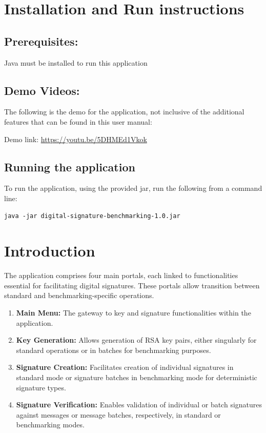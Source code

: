 \documentclass[]{final_report}
\begin{document}
\tableofcontents{}\newpage



\chapter{Installation and Run instructions}

\section*{Prerequisites:} Java must be installed to run this application

\section*{Demo Videos:}
The following is the demo for the application, not inclusive of the additional features that can be found in this user manual:

Demo link: \url{https://youtu.be/5DHMEd1Vkok}


\section*{Running the application}

To run the application, using the provided jar, run the following from a command line:

\begin{verbatim}
java -jar digital-signature-benchmarking-1.0.jar
\end{verbatim}



\chapter{Introduction}

The application comprises four main portals, each linked to functionalities essential for facilitating digital signatures. These portals allow transition between standard and benchmarking-specific operations.
\begin{enumerate}
    \item \textbf{Main Menu:} The gateway to key and signature functionalities within the application.
    \item \textbf{Key Generation:} Allows generation of RSA key pairs, either singularly for standard operations or in batches for benchmarking purposes.
    \item \textbf{Signature Creation:} Facilitates creation of individual signatures in standard mode or signature batches in benchmarking mode for deterministic signature types.
    \item \textbf{Signature Verification:} Enables validation of individual or batch signatures against messages or message batches, respectively, in standard or benchmarking modes.
\end{enumerate}
\end{document}
